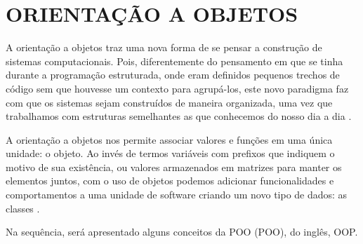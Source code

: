 \section{ORIENTAÇÃO A OBJETOS}

A orientação a objetos traz uma nova forma de se pensar a construção de sistemas
computacionais. Pois, diferentemente do pensamento em que se tinha durante a 
programação estruturada, onde eram definidos pequenos trechos de código sem que 
houvesse um contexto para agrupá-los, este novo paradigma faz com que os sistemas 
sejam construídos de maneira organizada, uma vez que trabalhamos com estruturas 
semelhantes as que conhecemos do nosso dia a dia
\cite{phpProgramandoComOrientacaoAObjetos}.

A orientação a objetos nos permite associar valores e funções em uma única
unidade: o objeto. Ao invés de termos variáveis com prefixos que indiquem o 
motivo de sua existência, ou valores armazenados em matrizes para manter os 
elementos juntos, com o uso de objetos podemos adicionar funcionalidades e 
comportamentos a uma unidade de software criando um novo tipo de dados: as 
classes \cite{phpMasterWriteCuttingEdgeCode}.

Na sequência, será apresentado alguns conceitos da \acl{POO} (\acs{POO}), do
inglês, \ac{OOP}.













